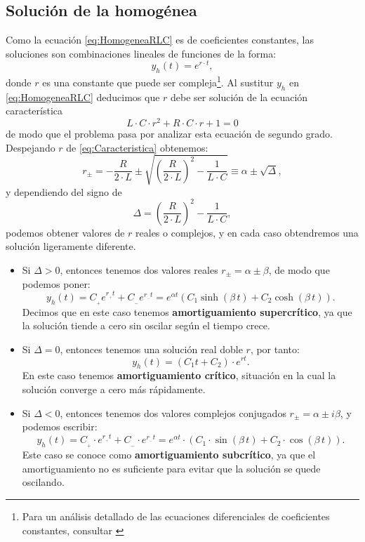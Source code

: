 \subsection{Solución de la homogénea} \label{solucionHomogenea}
Como la ecuación \eqref{eq:HomogeneaRLC} es de coeficientes constantes, las soluciones son combinaciones lineales de funciones de la forma:
\[
y_h(t) = e^{r\cdot t},
\]
donde $r$ es una constante que puede ser compleja\footnote{Para un análisis detallado de las ecuaciones diferenciales de coeficientes constantes, consultar \cite[p.~226]{DiPrima}}. Al sustitur $y_h$ en \eqref{eq:HomogeneaRLC} deducimos que $r$ debe ser solución de la ecuación característica
\begin{equation}
  \label{eq:Caracteristica}
  L\cdot C\cdot r^2 + R\cdot C\cdot r + 1 = 0
\end{equation}
de modo que el problema pasa por analizar esta ecuación de segundo grado. Despejando $r$ de \eqref{eq:Caracteristica} obtenemos:
\[
r_\pm = -\frac{R}{2\cdot L} \pm \sqrt{\left( \frac{R}{2\cdot L} \right)^2 - \frac{1}{L\cdot C}} \equiv \alpha \pm \sqrt{\Delta},
\]
y dependiendo del signo de
\[
\Delta = \left( \frac{R}{2\cdot L} \right)^2 - \frac{1}{L\cdot C},
\]
podemos obtener valores de $r$ reales o complejos, y en cada caso obtendremos una solución ligeramente diferente.
\begin{itemize}
  \item Si $\Delta > 0$, entonces tenemos dos valores reales $r_{\pm}=\alpha \pm \beta $, de modo que podemos poner:
\[
y_h(t) = C_{\!_+} e^{r_{\!_+} t} + C_{\!_-} e^{r_{\!_-}t} = e^{\alpha t}\left(C_1\sinh(\beta\, t) + C_2 \cosh(\beta\, t)\right).
\]
Decimos que en este caso tenemos \textbf{amortiguamiento supercrítico}, ya que la solución tiende a cero sin oscilar según el tiempo crece.
  \item Si $\Delta = 0$, entonces tenemos una solución real doble $r$, por tanto:
\[
y_h(t) = (C_1t+C_2)\cdot e^{rt}.
\]
En este caso tenemos \textbf{amortiguamiento crítico}, situación en la cual la solución converge a cero más rápidamente.
  \item Si $\Delta < 0$, entonces tenemos dos valores complejos conjugados $r_{\pm}=\alpha \pm i\beta$, y podemos escribir:
\[
y_h(t) = C_{\!_+} \cdot e^{r_{\!_+}  t} + C_{\!_-}\cdot  e^{r_{\!_-} t} = e^{\alpha t}\cdot \left(C_1\cdot \sin(\beta\, t) + C_2 \cdot \cos(\beta\, t)\right).
\]
Este caso se conoce como \textbf{amortiguamiento subcrítico}, ya que el amortiguamiento no es suficiente para evitar que la solución se quede oscilando.
\end{itemize}


